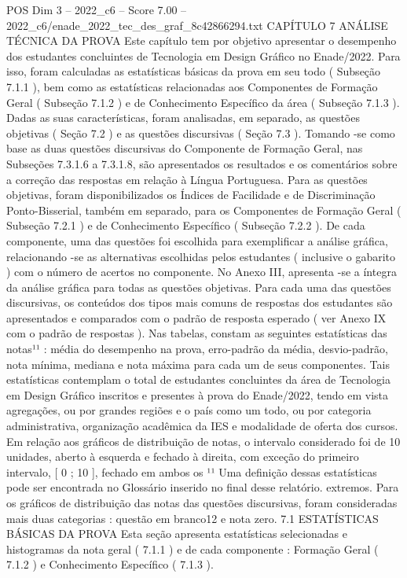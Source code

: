 \begin{textsample}{POS Dim 3 – 2022\_c6 – Score 7.00 – 2022\_c6/enade\_2022\_tec\_des\_graf\_8c42866294.txt}  \label{ex:f3_pos_024}
CAPÍTULO 7 ANÁLISE TÉCNICA DA PROVA Este capítulo tem por objetivo apresentar o desempenho dos estudantes concluintes de Tecnologia em Design Gráfico no Enade/2022.
Para isso, foram calculadas as estatísticas básicas da prova em seu todo ( Subseção 7.1.1 ), bem como as estatísticas relacionadas aos Componentes de Formação Geral ( Subseção 7.1.2 ) e de Conhecimento Específico da área ( Subseção 7.1.3 ).
Dadas as suas características, foram analisadas, em separado, as questões objetivas ( Seção 7.2 ) e as questões discursivas ( Seção 7.3 ).
Tomando -se como base as duas questões discursivas do Componente de Formação Geral, nas Subseções 7.3.1.6 a 7.3.1.8, são apresentados os resultados e os comentários sobre a correção das respostas em relação à Língua Portuguesa.
Para as questões objetivas, foram disponibilizados os Índices de Facilidade e de Discriminação Ponto-Bisserial, também em separado, para os Componentes de Formação Geral ( Subseção 7.2.1 ) e de Conhecimento Específico ( Subseção 7.2.2 ).
De cada componente, uma das questões foi escolhida para exemplificar a análise gráfica, relacionando -se as alternativas escolhidas pelos estudantes ( inclusive o gabarito ) com o número de acertos no componente.
No Anexo III, apresenta -se a íntegra da análise gráfica para todas as questões objetivas.
Para cada uma das questões discursivas, os conteúdos dos tipos mais comuns de respostas dos estudantes são apresentados e comparados com o padrão de resposta esperado ( ver Anexo IX com o padrão de respostas ).
Nas tabelas, constam as seguintes estatísticas das notas¹¹ : média do desempenho na prova, erro-padrão da média, desvio-padrão, nota mínima, mediana e nota máxima para cada um de seus componentes.
Tais estatísticas contemplam o total de estudantes concluintes da área de Tecnologia em Design Gráfico inscritos e presentes à prova do Enade/2022, tendo em vista agregações, ou por grandes regiões e o país como um todo, ou por categoria administrativa, organização acadêmica da IES e modalidade de oferta dos cursos.
Em relação aos gráficos de distribuição de notas, o intervalo considerado foi de 10 unidades, aberto à esquerda e fechado à direita, com exceção do primeiro intervalo, [ 0 ; 10 ], fechado em ambos os ¹¹ Uma definição dessas estatísticas pode ser encontrada no Glossário inserido no final desse relatório. extremos.
Para os gráficos de distribuição das notas das questões discursivas, foram consideradas mais duas categorias : questão em branco12 e nota zero. 7.1 ESTATÍSTICAS BÁSICAS DA PROVA Esta seção apresenta estatísticas selecionadas e histogramas da nota geral ( 7.1.1 ) e de cada componente : Formação Geral ( 7.1.2 ) e Conhecimento Específico ( 7.1.3 ).

\end{textsample}
